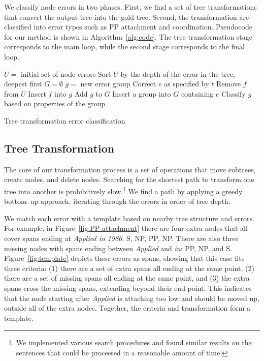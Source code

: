 We classify node errors in two phases.  First, we find a set of tree
transformations that convert the output tree into the gold tree.  Second, the
transformation are classified into error types such as PP attachment and
coordination.  Pseudocode for our method is shown in Algorithm~\ref{alg:code}.
The tree transformation stage corresponds to the main loop, while the second
stage corresponds to the final loop.

\begin{algorithm}[t]
\small
\begin{algorithmic}
\small
\State $U =$ initial set of node errors
\State Sort $U$ by the depth of the error in the tree, deepest first
\State $G = \emptyset$
\Repeat
			\State $g =$ new error group
			\State Correct $e$ as specified by $t$
				\State Remove $f$ from $U$
				\State Insert $f$ into $g$
			\EndFor
			\State Add $g$ to $G$
		\EndIf
	\EndFor
{}
	\State Insert a group into $G$ containing $e$
\EndFor
{}
	\State Classify $g$ based on properties of the group
\EndFor
\end{algorithmic}
\caption{\small
\label{alg:code}
	Tree transformation error classification
}
\end{algorithm}

\subsection{Tree Transformation}

The core of our transformation process is a set of operations that move
subtrees, create nodes, and delete nodes.  Searching for the shortest path to
transform one tree into another is prohibitively slow.\footnote{We implemented
various search procedures and found similar results on the sentences that could
be processed in a reasonable amount of time.}  We find a path by applying a
greedy bottom--up approach, iterating through the errors in order of tree depth.

We match each error with a template based on nearby tree structure and
errors.  For example, in Figure~\ref{fig:PP-attachment} there are four extra
nodes that all cover spans ending at \emph{Applied in 1986}: S, NP, PP, NP.
There are also three missing nodes with spans ending between \emph{Applied} and
\emph{in}: PP, NP, and S.  Figure~\ref{fig:template} depicts these errors as
spans, showing that this case fits three criteria: (1) there are a set of extra
spans all ending at the same point, (2) there are a set of missing spans all
ending at the same point, and (3) the extra spans cross the missing spans,
extending beyond their end-point.  This indicates that the node starting after
\emph{Applied} is attaching too low and should be moved up, outside all of the
extra nodes.  Together, the criteria and transformation form a template.

